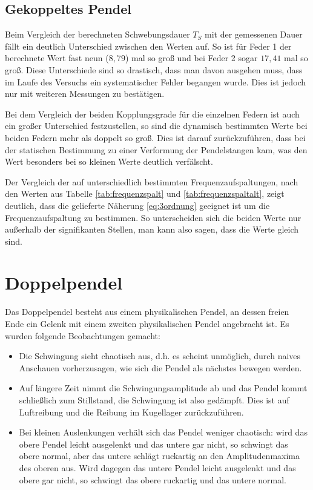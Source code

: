 \subsection{Gekoppeltes Pendel}
Beim Vergleich der berechneten Schwebungsdauer $T_S$ mit der gemessenen Dauer fällt ein deutlich Unterschied zwischen den Werten auf. So ist für Feder 1 der berechnete Wert fast neun ($8,79$) mal so groß und bei Feder 2 sogar $17,41$ mal so groß. Diese Unterschiede sind so drastisch, dass man davon ausgehen muss, dass im Laufe des Versuchs ein systematischer Fehler begangen wurde. Dies ist jedoch nur mit weiteren Messungen zu bestätigen.

Bei dem Vergleich der beiden Kopplungsgrade für die einzelnen Federn ist auch ein großer Unterschied festzustellen, so sind die dynamisch bestimmten Werte bei beiden Federn mehr als doppelt so groß. Dies ist darauf zurückzuführen, dass bei der statischen Bestimmung zu einer Verformung der Pendelstangen kam, was den Wert besonders bei so kleinen Werte deutlich verfälscht.

Der Vergleich der auf unterschiedlich bestimmten Frequenzaufspaltungen, nach den Werten aus Tabelle \ref{tab:frequenzspalt} und \ref{tab:frequenzspaltalt}, zeigt deutlich, dass die gelieferte Näherung \ref{eq:3ordnung} geeignet ist um die Frequenzaufspaltung zu bestimmen. So unterscheiden sich die beiden Werte nur außerhalb der signifikanten Stellen, man kann also sagen, dass die Werte gleich sind. 
\section{Doppelpendel}
Das Doppelpendel besteht aus einem physikalischen Pendel, an dessen freien Ende ein Gelenk mit einem zweiten physikalischen Pendel angebracht ist. Es wurden folgende Beobachtungen gemacht:
\begin{itemize}
  \item Die Schwingung sieht chaotisch aus, d.h. es scheint unmöglich, durch naives Anschauen vorherzusagen, wie sich die Pendel als nächstes bewegen werden.
  \item Auf längere Zeit nimmt die Schwingungsamplitude ab und das Pendel kommt schließlich zum Stillstand, die Schwingung ist also gedämpft. Dies ist auf Luftreibung und die Reibung im Kugellager zurückzuführen.
  \item Bei kleinen Auslenkungen verhält sich das Pendel weniger chaotisch: wird das obere Pendel leicht ausgelenkt und das untere gar nicht, so schwingt das obere normal, aber das untere schlägt ruckartig an den Amplitudenmaxima des oberen aus.
    Wird dagegen das untere Pendel leicht ausgelenkt und das obere gar nicht, so schwingt das obere ruckartig und das untere normal.
\end{itemize}
